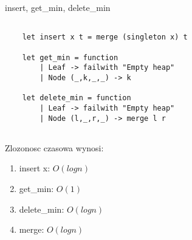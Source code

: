 \documentclass{article}
\begin{document}
insert, get\_min, delete\_min

\begin{lstlisting}

    let insert x t = merge (singleton x) t

    let get_min = function
        | Leaf -> failwith "Empty heap"
        | Node (_,k,_,_) -> k

    let delete_min = function
        | Leaf -> failwith "Empty heap"
        | Node (l,_,r,_) -> merge l r
    
\end{lstlisting}

Zlozonosc czasowa wynosi:

\begin{tcolorbox}[colback=white!90!blue,colframe=black!35!blue,title=]

    \begin{enumerate}[label=(\arabic*)]
        \item insert x: $O(logn)$
        \item get\_min: $O(1)$
        \item delete\_min: $O(logn)$
        \item merge: $O(logn)$
    
\end{enumerate}

\end{tcolorbox}
\end{document}
